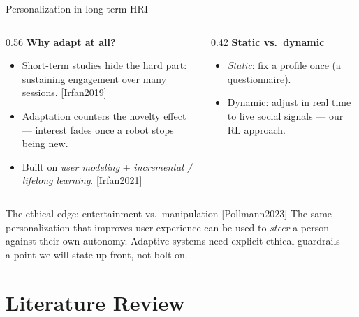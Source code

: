 \documentclass[aspectratio=169,10pt]{beamer}
\newcommand{\refnum}[1]{{\footnotesize\color{giuaccent}[#1]}}
\begin{document}
\begin{frame}{Personalization in long-term HRI}
  \begin{columns}[T]
    \begin{column}{0.56\textwidth}
      \textbf{Why adapt at all?}
      \begin{itemize}\footnotesize
        \item Short-term studies hide the hard part: sustaining engagement over many sessions. \refnum{Irfan2019}
        \item Adaptation counters the \alert{novelty effect} --- interest fades once a robot stops being new.
        \item Built on \emph{user modeling} + \emph{incremental / lifelong learning}. \refnum{Irfan2021}
      \end{itemize}
    \end{column}
    \begin{column}{0.42\textwidth}
      \textbf{Static vs.\ dynamic}
      \begin{itemize}\footnotesize
        \item \emph{Static}: fix a profile once (a questionnaire).
        \item \alert{Dynamic}: adjust in real time to live social signals --- our RL approach.
      \end{itemize}
    \end{column}
  \end{columns}
  \vspace{0.6em}
  \begin{alertblock}{The ethical edge: entertainment vs.\ manipulation \refnum{Pollmann2023}}
    The same personalization that improves user experience can be used to \emph{steer} a person against their own autonomy. Adaptive systems need explicit ethical guardrails --- a point we will state up front, not bolt on.
  \end{alertblock}
\end{frame}

\section{Literature Review}
\end{document}
